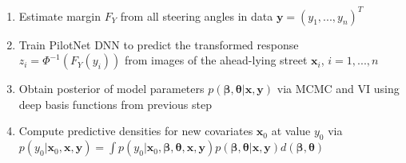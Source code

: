\documentclass[preview]{standalone}
\begin{document}
\begin{center}
\selectfont
        \begin{enumerate}
        \item Estimate margin $F_Y$ from all steering angles in data $\boldsymbol{y}= (y_1,...,y_n)^T$
        \item Train PilotNet DNN to predict the transformed response $z_i = \Phi^{-1}(F_Y(y_i))$ from images of the ahead-lying street $\boldsymbol{x}_i$, $i = 1,...,n$
        \item Obtain posterior of model parameters $p(\boldsymbol{\beta}, \boldsymbol{\theta}|  \boldsymbol{x}, \boldsymbol{y})$ via MCMC and VI using deep basis functions from previous step
        \item Compute predictive densities for new covariates $\boldsymbol{x}_0$ at value $y_0$ via $p(y_0 | \boldsymbol{x}_0, \boldsymbol{x}, \boldsymbol{y}) = \int p(y_0 | \boldsymbol{x}_0, \boldsymbol{\beta}, \boldsymbol{\theta}, \boldsymbol{x}, \boldsymbol{y})p(\boldsymbol{\beta}, \boldsymbol{\theta}| \boldsymbol{x}, \boldsymbol{y})d(\boldsymbol{\beta}, \boldsymbol{\theta})$
        \end{enumerate}
\end{center}
\end{document}
